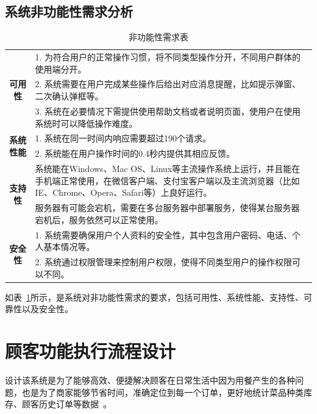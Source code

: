 \subsection{系统非功能性需求分析}
\begin{table}[htbp!]
  \footnotesize
  \centering
  \caption{非功能性需求表}
  \vspace{2mm}
  \begin{tabular}{cp{9.5cm}}
  \hline
  \multirow{3}{3.5cm}{
    \textbf{可用性}
    }&1. 为符合用户的正常操作习惯，将不同类型操作分开，不同用户群体的使用端分开。\\
    &2. 系统需要在用户完成某些操作后给出对应消息提醒，比如提示弹窗、二次确认弹框等。\\
    &3. 系统在必要情况下需提供使用帮助文档或者说明页面，使用户在使用系统时可以降低操作难度。\\
  \hline
  \multirow{2}{3.5cm}{
    \textbf{系统性能}
    }&1. 系统在同一时间内响应需要超过190个请求。\\
    &2. 系统能在用户操作时间的0.4秒内提供其相应反馈。\\
  \hline
  \multirow{2}{3.5cm}{
    \textbf{支持性}
    }&系统能在Windows、Mac OS、Linux等主流操作系统上运行，并且能在手机端正常使用，在微信客户端、支付宝客户端以及主流浏览器（比如IE、Chrome、Opera、Safari等）上良好运行。\\
  \hline
  \multirow{2}{3.5cm}{
    \textbf{可靠性}
    }&服务器有可能会宕机，需要在多台服务器中部署服务，使得某台服务器宕机后，服务依然可以正常使用。\\
  \hline
  \multirow{2}{3.5cm}{
    \textbf{安全性}
    }&1. 系统需要确保用户个人资料的安全性，其中包含用户密码、电话、个人基本情况等。\\
    &2. 系统通过权限管理来控制用户权限，使得不同类型用户的操作权限可以不同。\\
  \hline
  \end{tabular}
  \label{table:systemsRequirement}
\end{table}
如表~\ref{table:systemsRequirement}所示，是系统对非功能性需求的要求，包括可用性、系统性能、支持性、可靠性以及安全性。

\section{顾客功能执行流程设计}
设计该系统是为了能够高效、便捷解决顾客在日常生活中因为用餐产生的各种问题，也是为了商家能够节省时间，准确定位到每一个订单，更好地统计菜品种类库存、顾客历史订单等数据~\cite{zss2018}。

